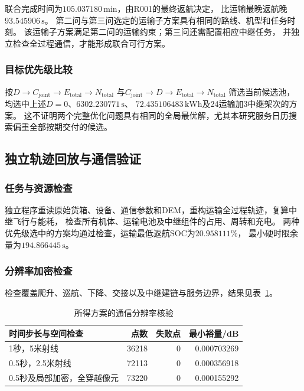 联合完成时间为$105.037180\,\mathrm{min}$，由R001的最终返航决定，
比运输最晚返航晚$93.545906\,\mathrm{s}$。
第二问与第三问选定的运输子方案具有相同的路线、机型和任务时刻。
该运输子方案满足第二问的运输约束；第三问还需配置相应中继任务，
并独立检查全过程通信，才能形成联合可行方案。

\subsubsection{目标优先级比较}
按$D\rightarrow C_{\mathrm{joint}}\rightarrow E_{\mathrm{total}}\rightarrow N_{\mathrm{total}}$
与$C_{\mathrm{joint}}\rightarrow D\rightarrow E_{\mathrm{total}}\rightarrow N_{\mathrm{total}}$
筛选当前候选池，均选中上述$D=0$、$6302.230771\,\mathrm{s}$、
$72.435106483\,\mathrm{kWh}$及24运输加3中继架次的方案。
这不证明两个完整优化问题具有相同的全局最优解，尤其本研究服务日历搜索偏重全部按期交付的候选。

\subsection{独立轨迹回放与通信验证}
\subsubsection{任务与资源检查}
独立程序重读原始货箱、设备、通信参数和DEM，重构运输全过程轨迹，复算中继飞行与能耗，
检查所有机体、运输电池及中继组件的占用、周转和充电。
两种优先级选中的方案均通过检查，运输最低返航SOC为$20.958111\%$，
最小硬时限余量为$194.866445\,\mathrm{s}$。

\subsubsection{分辨率加密检查}
检查覆盖爬升、巡航、下降、交接以及中继建链与服务边界，结果见表~\ref{tab:q3_refinement}。
\begin{table}[htbp]
\centering
\small
\caption{所得方案的通信分辨率核验}
\label{tab:q3_refinement}
\begin{tabular}{lrrr}
\toprule
时间步长与空间检查 & 点数 & 失败点 & 最小裕量/dB \\
\midrule
1秒，5米射线 & 36218 & 0 & 0.000703269 \\
0.5秒，2.5米射线 & 72113 & 0 & 0.000356918 \\
0.5秒及局部加密，全穿越像元 & 73220 & 0 & 0.000155292 \\
\bottomrule
\end{tabular}
\end{table}


